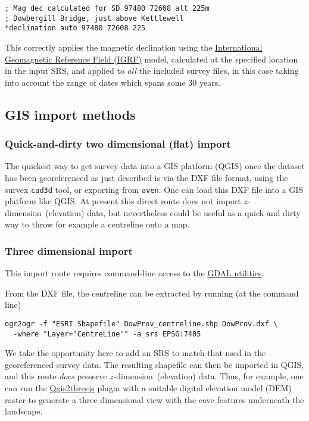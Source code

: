 \documentclass[]{article}
\newcommand{\zdimension}{$z$-dimension}
\begin{document}
\begin{verbatim}
; Mag dec calculated for SD 97480 72608 alt 225m
; Dowbergill Bridge, just above Kettlewell
*declination auto 97480 72608 225
\end{verbatim}

This correctly applies the magnetic declination using the
\href{https://en.wikipedia.org/wiki/International_Geomagnetic_Reference_Field}{International
Geomagnetic Reference Field (IGRF)} model, calculated at the specified
location in the input SRS, and applied to \emph{all} the included survey
files, in this case taking into account the range of dates which spans
some 30 years.

\subsection{GIS import methods}\label{gis-import-methods}

\subsubsection{Quick-and-dirty two dimensional (flat)
import}\label{quick-and-dirty-two-dimensional-flat-import}

The quickest way to get survey data into a GIS platform (QGIS) once the
dataset has been georeferenced as just described is via the DXF file
format, using the survex \verb}cad3d} tool, or exporting from
\verb}aven}. One can load this DXF file into a GIS platform like QGIS.
At present this direct route does not import \zdimension\ (elevation)
data, but nevertheless could be useful as a quick and dirty way to throw
for example a centreline onto a map.

\subsubsection{Three dimensional import}\label{three-dimensional-import}

This import route requires command-line access to the
\href{http://www.gdal.org/ogr_utilities.html}{GDAL utilities}.

From the DXF file, the centreline can be extracted by running (at the
command line)

\begin{verbatim}
ogr2ogr -f "ESRI Shapefile" DowProv_centreline.shp DowProv.dxf \
  -where "Layer='CentreLine'" -a_srs EPSG:7405
\end{verbatim}

We take the opportunity here to add an SRS to match that used in the
georeferenced survey data. The resulting shapefile can then be imported
in QGIS, and this route \emph{does} preserve \zdimension\ (elevation)
data. Thus, for example, one can run the
\href{https://plugins.qgis.org/plugins/Qgis2threejs/}{Qgis2threejs}
plugin with a suitable digital elevation model (DEM) raster to generate
a three dimensional view with the cave features underneath the
landscape.
\end{document}
